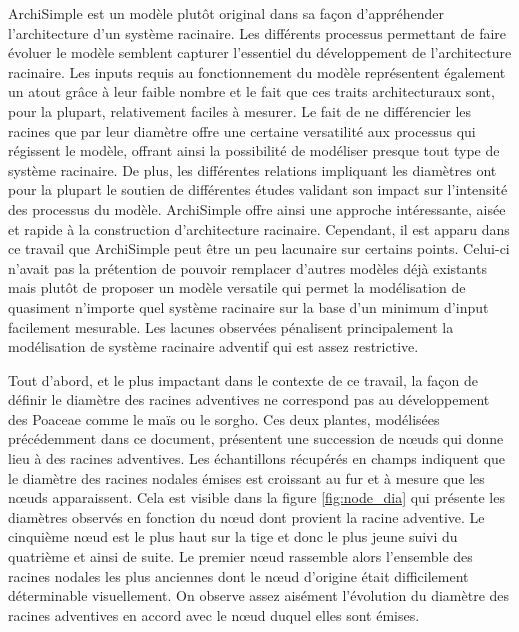 ArchiSimple est un modèle plutôt original dans sa façon d'appréhender l'architecture d'un système racinaire.
Les différents processus permettant de faire évoluer le modèle semblent capturer l'essentiel du développement de l'architecture racinaire.
Les inputs requis au fonctionnement du modèle représentent également un atout grâce à leur faible nombre et le fait que ces traits architecturaux sont, pour la plupart, relativement faciles à mesurer.
Le fait de ne différencier les racines que par leur diamètre offre une certaine versatilité aux processus qui régissent le modèle, offrant ainsi la possibilité de modéliser presque tout type de système racinaire.
De plus, les différentes relations impliquant les diamètres ont pour la plupart le soutien de différentes études validant son impact sur l'intensité des processus du modèle.
ArchiSimple offre ainsi une approche intéressante, aisée et rapide à la construction d'architecture racinaire.
Cependant, il est apparu dans ce travail que ArchiSimple peut être un peu lacunaire sur certains points.
Celui-ci n'avait pas la prétention de pouvoir remplacer d'autres modèles déjà existants mais plutôt de proposer un modèle versatile qui permet la modélisation de quasiment n'importe quel système racinaire sur la base d'un minimum d'input facilement mesurable.
Les lacunes observées pénalisent principalement la modélisation de système racinaire adventif qui est assez restrictive.
\newline

Tout d'abord, et le plus impactant dans le contexte de ce travail, la façon de définir le diamètre des racines adventives ne correspond pas au développement des Poaceae comme le maïs ou le sorgho.
Ces deux plantes, modélisées précédemment dans ce document, présentent une succession de nœuds qui donne lieu à des racines adventives.
Les échantillons récupérés en champs indiquent que le diamètre des racines nodales émises est croissant au fur et à mesure que les nœuds apparaissent.
Cela est visible dans la figure \ref{fig:node_dia} qui présente les diamètres observés en fonction du nœud dont provient la racine adventive.
Le cinquième nœud est le plus haut sur la tige et donc le plus jeune suivi du quatrième et ainsi de suite.
Le premier nœud rassemble alors l'ensemble des racines nodales les plus anciennes dont le nœud d'origine était difficilement déterminable visuellement.
On observe assez aisément l'évolution du diamètre des racines adventives en accord avec le nœud duquel elles sont émises.

